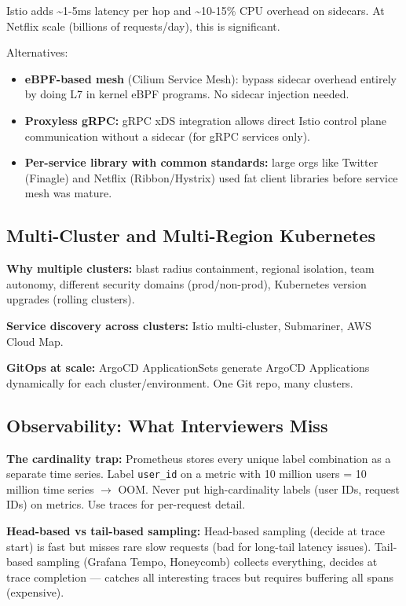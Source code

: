\documentclass[11pt]{article}
\providecommand{\tightlist}{\setlength{\itemsep}{1pt}\setlength{\parskip}{0pt}}
\begin{document}
Istio adds \textasciitilde1-5ms latency per hop and \textasciitilde10-15\% CPU overhead on sidecars. At Netflix scale (billions of requests/day), this is significant.

Alternatives:

\begin{itemize}
\tightlist
\item
  \textbf{eBPF-based mesh} (Cilium Service Mesh): bypass sidecar overhead entirely by doing L7 in kernel eBPF programs. No sidecar injection needed.
\item
  \textbf{Proxyless gRPC:} gRPC xDS integration allows direct Istio control plane communication without a sidecar (for gRPC services only).
\item
  \textbf{Per-service library with common standards:} large orgs like Twitter (Finagle) and Netflix (Ribbon/Hystrix) used fat client libraries before service mesh was mature.
\end{itemize}

\subsection{Multi-Cluster and Multi-Region Kubernetes}\label{multi-cluster-and-multi-region-kubernetes}

\textbf{Why multiple clusters:} blast radius containment, regional isolation, team autonomy, different security domains (prod/non-prod), Kubernetes version upgrades (rolling clusters).

\textbf{Service discovery across clusters:} Istio multi-cluster, Submariner, AWS Cloud Map.

\textbf{GitOps at scale:} ArgoCD ApplicationSets generate ArgoCD Applications dynamically for each cluster/environment. One Git repo, many clusters.

\subsection{Observability: What Interviewers Miss}\label{observability-what-interviewers-miss}

\textbf{The cardinality trap:} Prometheus stores every unique label combination as a separate time series. Label \texttt{user\_id} on a metric with 10 million users = 10 million time series \(\rightarrow\) OOM. Never put high-cardinality labels (user IDs, request IDs) on metrics. Use traces for per-request detail.

\textbf{Head-based vs tail-based sampling:} Head-based sampling (decide at trace start) is fast but misses rare slow requests (bad for long-tail latency issues). Tail-based sampling (Grafana Tempo, Honeycomb) collects everything, decides at trace completion --- catches all interesting traces but requires buffering all spans (expensive).
\end{document}
